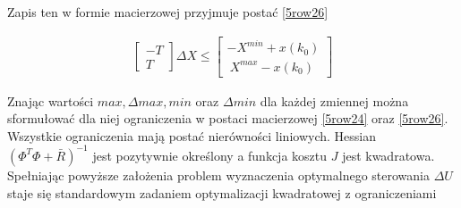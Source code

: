 Zapis ten w formie macierzowej przyjmuje postać \ref{5row26}

\begin{gather}
\label{5row26}
\begin{bmatrix} - T \\ T \end{bmatrix} \Delta X \leq \begin{bmatrix} -  X^{min} + x(k_0) \\ \ X^{max} -x(k_0) \end{bmatrix}
\end{gather}

Znając wartości $max, \Delta max, min$ oraz $ \Delta min$ dla każdej zmiennej można sformułować dla niej ograniczenia w postaci macierzowej \ref{5row24} oraz \ref{5row26}. Wszystkie ograniczenia mają postać nierówności liniowych. Hessian $(\Phi^T \Phi + \bar{R})^{-1}$ jest pozytywnie określony a funkcja kosztu $J$ jest kwadratowa. Spełniając powyższe założenia problem wyznaczenia optymalnego sterowania $\Delta U$ staje się standardowym zadaniem optymalizacji kwadratowej z ograniczeniami 

